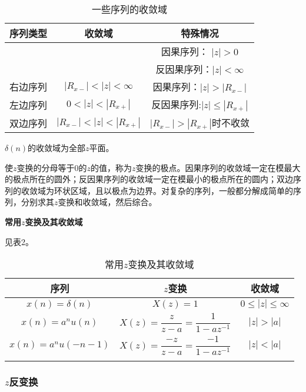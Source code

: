 \documentclass[cn, hazy, blue, normal, 14pt]{elegantnote}
\begin{document}
\begin{table}[htbp]
\centering
\caption{一些序列的收敛域}
\begin{tabular}{c|c|c}
    \toprule
    \textbf{序列类型} & \textbf{收敛域} & \textbf{特殊情况} \\
    \midrule
    {\multirow{2}{*}{有限长序列}} & {\multirow{2}{*}{$0<|z|<\infty$}} & 因果序列：   $|z|>0$      \\
    \cline{3-3}
    ~         & ~     &  反因果序列：$|z|<\infty$ \\
    \hline
    右边序列   & $|R_{x-}|<|z|<\infty$   & 因果序列：$|z|>|R_{x-}|$ \\
    \hline
    左边序列   & $0<|z|<|R_{x+}|$        & 反因果序列:$|z|\leq|R_{x+}|$ \\
    \hline
    双边序列   & $|R_{x-}|<|z|<|R_{x+}|$ & $|R_{x-}|>|R_{x+}|$时不收敛 \\
    \bottomrule
\end{tabular}
\end{table}

$\delta(n)$的收敛域为全部$z$平面。

使$z$变换的分母等于$0$的$z$的值，称为$z$变换的极点。因果序列的收敛域一定在模最大的极点所在的圆外；反因果序列的收敛域一定在模最小的极点所在的圆内；双边序列的收敛域为环状区域，且以极点为边界。对复杂的序列，一般都分解成简单的序列，分别求其$z$变换和收敛域，然后综合。

\textbf{常用$z$变换及其收敛域}

见表2。

\begin{table}[htbp]
\centering
\caption{常用$z$变换及其收敛域}
\begin{tabular}{c|c|c}
    \toprule
    \textbf{序列} & \textbf{$z$变换} & \textbf{收敛域} \\
    \midrule
    $x(n)=\delta(n)$  & $X(z)=1$ & $0\leq|z|\leq\infty$ \\
    \hline
    \addlinespace
    $x(n)=a^nu(n)$    & $X(z)=\dfrac{z}{z-a}=\dfrac{1}{1-az^{-1}}$ & $|z|>|a|$ \\
    \addlinespace
    \hline
    \addlinespace
    $x(n)=a^nu(-n-1)$ & $X(z)=\dfrac{-z}{z-a}=\dfrac{-1}{1-az^{-1}}$ & $|z|<|a|$ \\
    \addlinespace
    \bottomrule
\end{tabular}
\end{table}

\subsubsection{$z$反变换}
\end{document}
